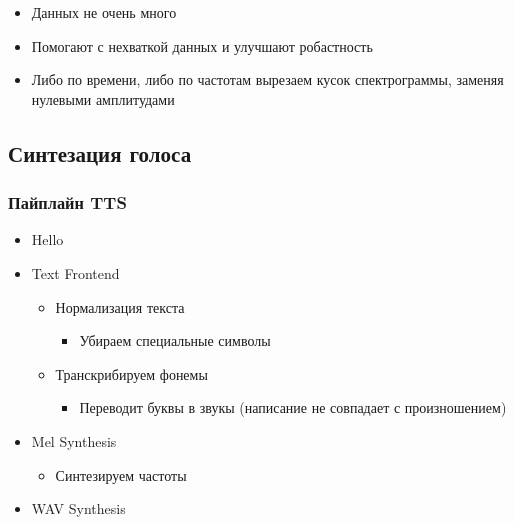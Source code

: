 \documentclass[a4paper, 12pt]{article}
\begin{document}
\begin{itemize}
\item
  
  Данных не очень много
  
\item
  
  Помогают с нехваткой данных и улучшают робастность
  
\item
  
  Либо по времени, либо по частотам вырезаем кусок спектрограммы,
  заменяя нулевыми амплитудами
  
\end{itemize}

\subsection{Синтезация
голоса}\label{ux441ux438ux43dux442ux435ux437ux430ux446ux438ux44f-ux433ux43eux43bux43eux441ux430}

\subsubsection{Пайплайн
TTS}\label{ux43fux430ux439ux43fux43bux430ux439ux43d-tts}

\begin{itemize}
\item
  
  Hello
  
\item
  
  Text Frontend
  

  \begin{itemize}
  \item
    
    Нормализация текста
    

    \begin{itemize}
    \item
      
      Убираем специальные символы
      
    \end{itemize}
  \item
    
    Транскрибируем фонемы
    

    \begin{itemize}
    \item
      
      Переводит буквы в звукы (написание не совпадает с произношением)
      
    \end{itemize}
  \end{itemize}
\item Mel Synthesis
  

  \begin{itemize}
  \item
    
    Синтезируем частоты
    
  \end{itemize}
\item
  
  WAV Synthesis
  
\end{itemize}
\end{document}
